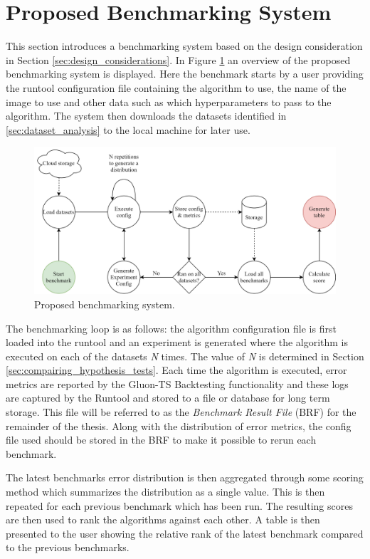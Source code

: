\section{Proposed Benchmarking System}
This section introduces a benchmarking system based on the design consideration in Section \ref{sec:design_considerations}.
In Figure \ref{fig:proposed_benchmarking_system} an overview of the proposed benchmarking system is displayed. Here the benchmark starts by a user providing the runtool configuration file containing the algorithm to use, the name of the image to use and other data such as which hyperparameters to pass to the algorithm. The system then downloads the datasets identified in \ref{sec:dataset_analysis} to the local machine for later use.
\begin{figure}[h]
  \centering
  \includegraphics[width=\linewidth]{./img/benchmarking_system_architecture.png}
  \caption{Proposed benchmarking system.}
  \label{fig:proposed_benchmarking_system}
\end{figure}

The benchmarking loop is as follows: the algorithm configuration file is first loaded into the runtool and an experiment is generated where the algorithm is executed on each of the datasets \textit{N} times. The value of \textit{N} is determined in Section \ref{sec:compairing_hypothesis_tests}. Each time the algorithm is executed, error metrics are reported by the Gluon-TS Backtesting functionality and these logs are captured by the Runtool and stored to a file or database for long term storage. This file will be referred to as the \textit{Benchmark Result File} (BRF) for the remainder of the thesis. Along with the distribution of error metrics, the config file used should be stored in the BRF to make it possible to rerun each benchmark.

The latest benchmarks error distribution is then aggregated through some scoring method which summarizes the distribution as a single value. This is then repeated for each previous benchmark which has been run. The resulting scores are then used to rank the algorithms against each other. A table is then presented to the user showing the relative rank of the latest benchmark compared to the previous benchmarks.


